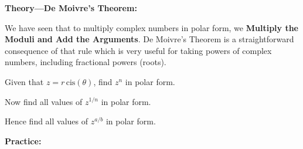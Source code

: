 \documentclass{article}
\newcommand{\cis}{\,\mathrm{cis}}
\begin{document}
\clearpage



\textbf{Theory---De Moivre's Theorem:}

\vspace{5mm}

We have seen that to multiply complex numbers in polar form, we \textbf{Multiply the Moduli and Add the Arguments}. De Moivre's Theorem is a straightforward consequence of that rule which is very useful for taking powers of complex numbers, including fractional powers (roots).\medskip

Given that $z=r\cis(\theta)$, find $z^n$ in polar form.

\vfill


Now find all values of $z^{1/n}$ in polar form.

\vfill

Hence find all values of $z^{a/b}$ in polar form.

\vfill











\clearpage


\textbf{Practice:}

\vspace{5mm}
\end{document}
